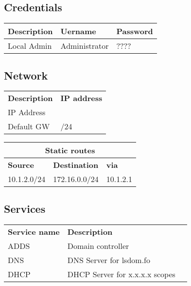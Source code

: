 	\subsection{Credentials}
	\begin{tabular}{|l|l|l|}		\hline
		\textbf{Description}	& \textbf{Uername}	& \textbf{Password}	\\ \hline
		Local Admin				& Administrator		& ???? 				\\ \hline
	\end{tabular}
	
	\subsection{Network}
	\begin{tabular}{|l|l|}		\hline
		\textbf{Description}	& \textbf{IP address}	\\
		IP Address				& 				\\
		Default GW				&  /24			\\ \hline
	\end{tabular}
	
	\vspace*{5mm}\noindent
	\begin{tabular}{|l|l|l|}	\hline
		\multicolumn{3}{|c|}{\textbf{Static routes}} \\ \hline
		\textbf{Source}		& \textbf{Destination}	& \textbf{via}	\\
		10.1.2.0/24			& 172.16.0.0/24			& 10.1.2.1		\\ \hline
	\end{tabular}
	
	\subsection{Services}
	\begin{tabular}{|l|l|l|}		\hline
		\textbf{Service name}	& \textbf{Description}				\\
		ADDS					& Domain controller					\\
		DNS						& DNS Server for lsdom.fo			\\
		DHCP					& DHCP Server for x.x.x.x scopes	\\ \hline
	\end{tabular}
	
